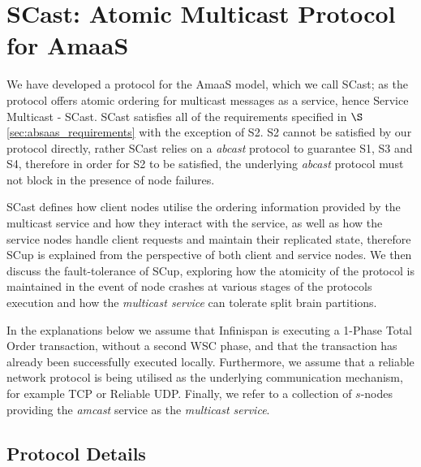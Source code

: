 \section{SCast: Atomic Multicast Protocol for AmaaS}\label{sec:scast_protocol}
We have developed a protocol for the \textsf{AmaaS} model, which we call \textsf{SCast}; as the protocol offers atomic ordering for multicast messages as a service, hence Service Multicast - \textsf{SCast}.  \textsf{SCast} satisfies all of the requirements specified in $\S$ \ref{sec:absaas_requirements} with the exception of S2.  S2 cannot be satisfied by our protocol directly, rather \textsf{SCast} relies on a \emph{abcast} protocol to guarantee S1, S3 and S4, therefore in order for S2 to be satisfied, the underlying \emph{abcast} protocol must not block in the presence of node failures.  

\textsf{SCast} defines how client nodes utilise the ordering information provided by the multicast service and how they interact with the service, as well as how the service nodes handle client requests and maintain their replicated state, therefore \textsf{SCup} is explained from the perspective of both client and service nodes.  We then discuss the fault-tolerance of \textsf{SCup}, exploring how the atomicity of the protocol is maintained in the event of node crashes at various stages of the protocols execution and how the \emph{multicast service} can tolerate split brain partitions.  

In the explanations below we assume that Infinispan is executing a 1-Phase Total Order transaction, without a second WSC phase, and that the transaction has already been successfully executed locally.  Furthermore, we assume that a reliable network protocol is being utilised as the underlying communication mechanism, for example TCP\citep{Cerf:2005:PPN:1064413.1064423} or Reliable UDP\citep{ReliableUDP}.  Finally, we refer to a collection of $s$-nodes providing the \emph{amcast} service as the \emph{multicast service}.  


    \subsection{Protocol Details}
